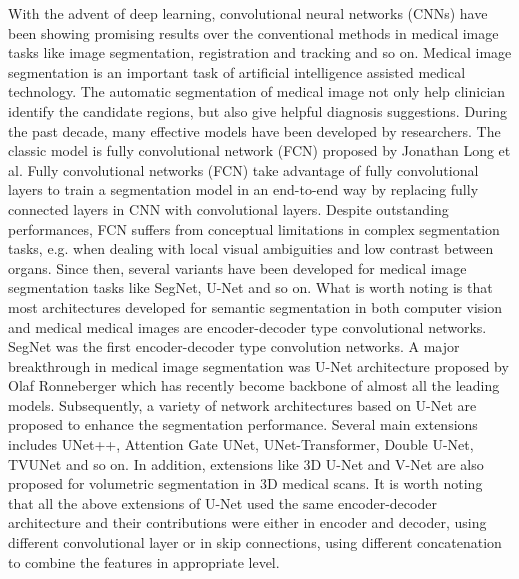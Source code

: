 \documentclass{ieeeaccess}
\begin{document}
  With the advent of deep learning, convolutional neural networks (CNNs) have been showing promising results over the conventional methods in medical image tasks like image segmentation, registration and tracking and so on. Medical image segmentation is an important task of artificial intelligence assisted medical technology. The automatic segmentation of medical image not only help clinician identify the candidate regions, but also give helpful diagnosis suggestions. During the past decade, many effective models have been developed by researchers. The classic model is fully convolutional network (FCN) proposed by Jonathan Long et al\cite{LongSD15}. Fully convolutional networks (FCN) take advantage of fully convolutional layers to train a segmentation model in an end-to-end way by replacing fully connected layers in CNN with convolutional layers. Despite outstanding performances, FCN suffers from conceptual limitations in complex segmentation tasks, e.g. when dealing with local visual ambiguities and low contrast between organs. Since then,  several variants have been developed for medical image segmentation tasks like SegNet, U-Net and so on. What is worth noting is that most architectures developed for semantic segmentation in both computer vision and medical medical images are encoder-decoder type convolutional networks. SegNet was the first encoder-decoder type convolution networks. A major breakthrough in medical image segmentation was U-Net architecture proposed by Olaf Ronneberger\cite{RonnebergerFB15} which has recently become backbone of almost all the leading models. Subsequently, a variety of network architectures based on U-Net are proposed to enhance the segmentation performance. Several main extensions includes UNet++, Attention Gate UNet, UNet-Transformer, Double U-Net, TVUNet and so on. In addition, extensions like 3D U-Net and V-Net are also proposed for volumetric segmentation in 3D medical scans. It is worth noting that all the above extensions of U-Net used the same encoder-decoder architecture and their contributions were either in encoder and decoder, using different convolutional layer or in skip connections, using different concatenation to combine the features in appropriate level. 
  
\end{document}
